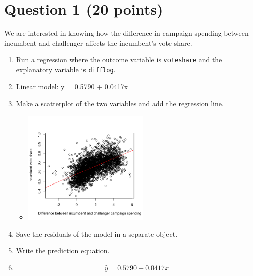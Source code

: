 \documentclass[12pt,letterpaper]{article}
\begin{document}
\section*{Question 1 (20 points)}
\vspace{.25cm}
\noindent We are interested in knowing how the difference in campaign spending between incumbent and challenger affects the incumbent's vote share. 
	\begin{enumerate}
		\item Run a regression where the outcome variable is \texttt{voteshare} and the explanatory variable is \texttt{difflog}.	
		\item[] Linear model: y = 0.5790 + 0.0417x
		
		\vspace{1cm}
		\item Make a scatterplot of the two variables and add the regression line. 
		\begin{itemize}
			\item []
		\includegraphics[width=0.5\textwidth]{Rplot.png}
		\end{itemize}
		
		\vspace{1cm}
		\item Save the residuals of the model in a separate object.	\vspace{1cm}
		
		\item Write the prediction equation.
		\item[]
		$$\hat{y} = 0.5790 + 0.0417x$$
	\end{enumerate}
	
\newpage
\end{document}
